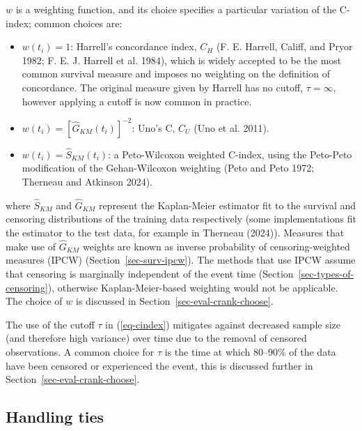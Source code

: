 \documentclass[
  letterpaper,
  krantz2]{style/krantz}
\providecommand{\tightlist}{%
  \setlength{\itemsep}{0pt}\setlength{\parskip}{0pt}}
\begin{document}
\(w\) is a weighting function, and its choice specifies a particular
variation of the C-index; common choices are:

\begin{itemize}
\tightlist
\item
  \(w(t_i) = 1\): Harrell's concordance
  index, \(C_H\) (F. E. Harrell,
  Califf, and Pryor 1982; F. E. J. Harrell et al. 1984), which is widely
  accepted to be the most common survival measure and imposes no
  weighting on the definition of concordance. The original measure given
  by Harrell has no cutoff, \(\tau = \infty\), however applying a cutoff
  is now common in practice.
\item
  \(w(t_i) = [\hat{G}_{KM}(t_i)]^{-2}\): Uno's C, \(C_U\) (Uno et al.
  2011).
\item
  \(w(t_i) = \hat{S}_{KM}(t_i)\): a Peto-Wilcoxon weighted C-index,
  using the Peto-Peto modification of the Gehan-Wilcoxon weighting (Peto
  and Peto 1972; Therneau and Atkinson 2024).
\end{itemize}

where \(\hat{S}_{KM}\) and \(\hat{G}_{KM}\) represent the Kaplan-Meier
estimator fit to the survival and
censoring distributions of the training data respectively (some
implementations fit the estimator to the test data, for example in
Therneau (2024)). Measures that make use of \(\hat{G}_{KM}\) weights are
known as inverse probability of censoring-weighted measures
(IPCW)
(Section~\ref{sec-surv-ipcw}). The methods that use IPCW assume that
censoring is marginally independent of the event time
(Section~\ref{sec-types-of-censoring}), otherwise Kaplan-Meier-based
weighting would not be applicable. The choice of \(w\) is discussed in
Section~\ref{sec-eval-crank-choose}.

The use of the cutoff \(\tau\) in (\ref{eq-cindex}) mitigates against
decreased sample size (and therefore high variance) over time due to the
removal of censored observations. A common choice for \(\tau\) is the
time at which 80--90\% of the data have been censored or experienced the
event, this is discussed further in Section~\ref{sec-eval-crank-choose}.

\subsection{Handling ties}\label{sec-cindex-ties}
\end{document}
